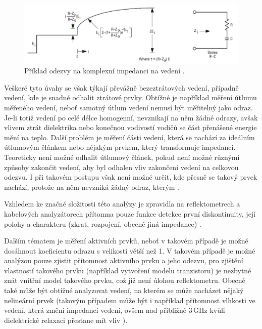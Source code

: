 \begin{figure}[htbp]\includegraphics[width=\textwidth,keepaspectratio]{images/samplecomplexresponse.png}\caption{Příklad odezvy na komplexní impedanci na vedení \cite{broadbandreflectometry}.}\label{complexresponse}\end{figure}

Veškeré tyto úvahy se však týkají převážně bezeztrátových vedení, případně vedení, kde je snadné odhalit ztrátové prvky. Obtížné je například měření útlumu měřeného vedení, neboť samotný útlum vedení nemusí být měřitelný jako odraz. Je-li totiž vedení po celé délce homogenní, nevznikají na něm žádné odrazy, avšak vlivem ztrát dielektrika nebo konečnou vodivostí vodičů se část přenášené energie mění na teplo. Další problém je měření části vedení, která se nachází za ideálním útlumovým článkem nebo nějakým prvkem, který transformuje impedanci. Teoreticky není možné odhalit útlumový článek, pokud není možné různými způsoby zakončit vedení, aby byl odhalen vliv zakončení vedení na celkovou odezvu. I při takovém postupu však není možné určit, kde přesně se takový prvek nachází, protože na něm nevzniká žádný odraz, kterým . 

Vzhledem ke značné složitosti této analýzy je zpravidla na reflektometrech a kabelových analyzátorech přítomna pouze funkce detekce první diskontinuity, její polohy a charakteru (zkrat, rozpojení, obecně jiná impedance) \cite{CT-100Bmanual} .

Dalším tématem je měření aktivních prvků, neboť v takovém případě je možné dosáhnout koeficientu odrazu s velikostí větší než 1. V takovém případě je možné analýzou pouze zjistit přítomnost aktivního prvku a jeho odezvu, pro zjištění vlastností takového prvku (například vytvoření modelu tranzistoru) je nezbytné znát vnitřní model takového prvku, což již není úlohou reflektometru. Obecně také může být obtížné analyzovat vedení, na kterém se může nacházet nějaký nelineární prvek (takovým případem může být i například přítomnost vlhkosti ve vedení, která změní impedanci vedení, ovšem nad přibližně 3\,GHz kvůli dielektrické relaxaci přestane mít vliv \cite{relaxationspectroscopy}).


